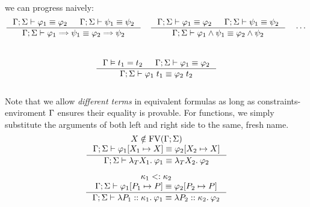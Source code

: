 \documentclass[english, mgr]{iithesis}
\renewcommand{\it}[1]{\textit{#1}}
\begin{document}
we can progress naively:
\\
$$
  \inference{
    \jgmnt[\Gamma; \Sigma]{\formphi_1 \equiv \formphi_2 } &
    \jgmnt[\Gamma; \Sigma]{\psi_1 \equiv \psi_2 }
    }{
    \jgmnt[\Gamma; \Sigma]{\formphi_1 \fImp \psi_1 \equiv \formphi_2 \fImp \psi_2 }
  }
  \quad
  \inference{
    \jgmnt[\Gamma; \Sigma]{\formphi_1 \equiv \formphi_2 } &
    \jgmnt[\Gamma; \Sigma]{\psi_1 \equiv \psi_2 }
    }{
    \jgmnt[\Gamma; \Sigma]{\formphi_1 \wedge \psi_1 \equiv \formphi_2 \wedge \psi_2 }
  }
  \quad
  \cdots
$$
\\
$$
  \inference{
    \cjgmnt[\Gamma]{\term_1 \ceq \term_2} &
    \jgmnt[\Gamma; \Sigma]{\formphi_1 \equiv \formphi_2 }
    }{
    \jgmnt[\Gamma; \Sigma]{\formphi_1 \fAppTerm \term_1 \equiv \formphi_2 \fAppTerm \term_2 }
  }
$$
\\
Note that we allow \it{different terms} in equivalent formulas as long as
constraints-enviroment $\Gamma$ ensures their equality is provable.
For functions, we simply substitute the arguments of both left and right side
to the same, fresh name.
\\
$$
  \inference{
    \termv \notin \fv[\Gamma; \Sigma] \\
    \jgmnt[\Gamma; \Sigma]{\formphi_1[\termv_1 \mapsto \termv] \equiv \formphi_2[\termv_2 \mapsto \termv] }
    }{
    \jgmnt[\Gamma; \Sigma]{\fLamTerm{\termv_1}\formphi_1 \equiv \fLamTerm{\termv_2}\formphi_2 }
  }
$$

$$
  \inference{
    \kind_1 \subkind \kind_2 \\
    \jgmnt[\Gamma; \Sigma]{\formphi_1[P_1 \mapsto P] \equiv \formphi_2[P_2 \mapsto P] }
    }{
    \jgmnt[\Gamma; \Sigma]{\fLamForm{P_1}{\kind_1}{\formphi_1} \equiv \fLamForm{P_2}{\kind_2}{\formphi_2}}
  }
$$
\end{document}
